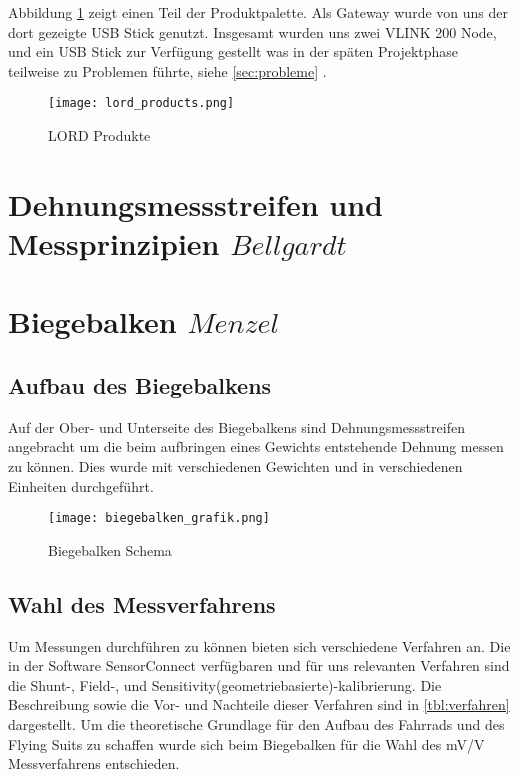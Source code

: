 Abbildung \ref{fig:lordproducts} zeigt einen Teil der Produktpalette.
Als Gateway wurde von uns der dort gezeigte USB Stick genutzt.
Insgesamt wurden uns zwei VLINK 200 Node, und ein USB Stick zur Verfügung gestellt was in der späten Projektphase teilweise zu Problemen führte,
siehe \ref{sec:probleme} .

\begin{figure}[h]
    \begin{center}
        \texttt{[image: lord\_products.png]}
        \caption[LORD Produkte (Abbildungsverzeichnis)]{LORD Produkte
        \cite{VLInkManual}
        }
        \label{fig:lordproducts}
    \end{center}
\end{figure}

\section{Dehnungsmessstreifen und Messprinzipien \(Bellgardt\)}




\section{Biegebalken \(Menzel\)}
\subsection{Aufbau des Biegebalkens}
Auf der Ober- und Unterseite des Biegebalkens sind Dehnungsmessstreifen angebracht um die beim aufbringen eines Gewichts entstehende Dehnung messen zu können.
Dies wurde mit verschiedenen Gewichten und in verschiedenen Einheiten durchgeführt.
\begin{figure}[h]
    \begin{center}
        \texttt{[image: biegebalken\_grafik.png]}
        \caption[Biegebalken Schema (Abbildungsverzeichnis)]{Biegebalken Schema
        }
        \label{fig:biegebalkenschema}
    \end{center}
\end{figure}

\subsection{Wahl des Messverfahrens}
Um Messungen durchführen zu können bieten sich verschiedene Verfahren an.
Die in der Software SensorConnect verfügbaren und für uns relevanten Verfahren sind die Shunt-, Field-, und Sensitivity(geometriebasierte)-kalibrierung.
Die Beschreibung sowie die Vor- und Nachteile dieser Verfahren sind in \ref{tbl:verfahren}  dargestellt.
Um die theoretische Grundlage für den Aufbau des Fahrrads und des Flying Suits zu schaffen wurde sich beim Biegebalken für die Wahl des mV/V Messverfahrens entschieden.

